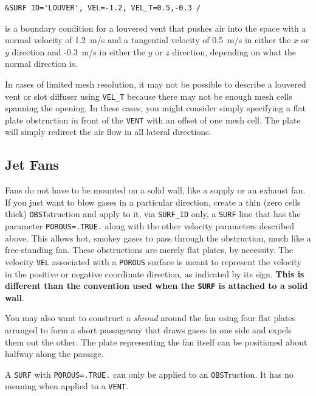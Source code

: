\documentclass[11pt]{book}
\newcommand{\ct}{\tt\small}
\begin{document}
\footnotesize
\begin{verbatim}
&SURF ID='LOUVER', VEL=-1.2, VEL_T=0.5,-0.3 /
\end{verbatim}
\normalsize

\noindent
is a boundary condition for a louvered vent that pushes air into the
space with a normal velocity of 1.2~m/s and a tangential velocity
of 0.5~m/s in either the $x$ or $y$ direction and -0.3~m/s in either
the $y$ or $z$ direction, depending on what the normal direction is.

In cases of limited mesh resolution, it may not be possible to describe a louvered vent or
slot diffuser using {\ct VEL\_T} because there may not be enough mesh cells spanning the
opening. In these cases, you might consider simply specifying a flat plate obstruction in front of the
{\ct VENT} with an offset of one mesh cell. The plate will simply redirect the air flow in all lateral
directions.

\subsection{Jet Fans}

Fans do not have to be mounted on a solid wall, like a supply or an exhaust fan.
If you just want to blow gases in a particular direction, create a thin (zero cells thick)
{\ct OBST}struction and apply to it, via {\ct SURF\_ID} only, a {\ct SURF} line that has
the parameter {\ct POROUS=.TRUE.} along with the other velocity parameters described above.
This allows hot, smokey gases to pass through the
obstruction, much like a free-standing fan. These obstructions are merely
flat plates, by necessity. The velocity {\ct VEL} associated with a
{\ct POROUS} surface is meant to represent the velocity in the
positive or negative coordinate direction, as indicated by its
sign. {\bf This is different than the convention used when the {\ct SURF}
is attached to a solid wall}.

You may also want to construct a {\em shroud} around the fan using four flat plates arranged to form
a short passageway that draws gases in one side and expels them out the other. The plate representing the
fan itself can be positioned about halfway along the passage.

\begin{warning}
A {\ct SURF} with {\ct POROUS=.TRUE.} can only be applied to an {\ct OBST}ruction. It has no meaning when
applied to a {\ct VENT}.
\end{warning}
\end{document}
